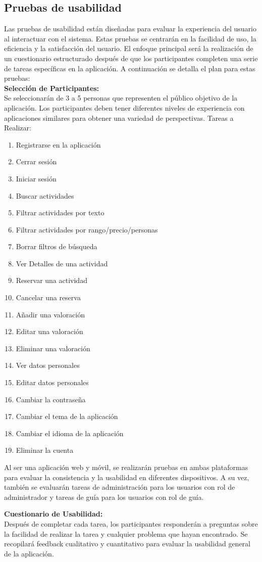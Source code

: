 \subsection{Pruebas de usabilidad}
Las pruebas de usabilidad están diseñadas para evaluar la experiencia del usuario al interactuar con el sistema. Estas pruebas se centrarán en la facilidad de uso, la eficiencia y la satisfacción del usuario. El enfoque principal será la realización de un cuestionario estructurado después de que los participantes completen una serie de tareas específicas en la aplicación. A continuación se detalla el plan para estas pruebas:
\\[1ex]
\textbf{Selección de Participantes:}
\\[1ex]
Se seleccionarán de 3 a 5 personas que representen el público objetivo de la aplicación.
Los participantes deben tener diferentes niveles de experiencia con aplicaciones similares para obtener una variedad de perspectivas.
Tareas a Realizar:
\begin{enumerate}
	\item Registrarse en la aplicación
	\item Cerrar sesión
	\item Iniciar sesión
	\item Buscar actividades
	\item Filtrar actividades por texto
	\item Filtrar actividades por rango/precio/personas
	\item Borrar filtros de búsqueda
	\item Ver Detalles de una actividad
	\item Reservar una actividad
	\item Cancelar una reserva
	\item Añadir una valoración
	\item Editar una valoración
	\item Eliminar una valoración
	\item Ver datos personales
	\item Editar datos personales
	\item Cambiar la contraseña
	\item Cambiar el tema de la aplicación
	\item Cambiar el idioma de la aplicación
	\item Eliminar la cuenta
\end{enumerate}

Al ser una aplicación web y móvil, se realizarán pruebas en ambas plataformas para evaluar la consistencia y la usabilidad en diferentes dispositivos.
A su vez, también se evaluarán tareas de administración para los usuarios con rol de administrador y tareas de guía para los usuarios con rol de guía.

\textbf{Cuestionario de Usabilidad:}
\\[1ex]
Después de completar cada tarea, los participantes responderán a preguntas sobre la facilidad de realizar la tarea y cualquier problema que hayan encontrado.
Se recopilará feedback cualitativo y cuantitativo para evaluar la usabilidad general de la aplicación.